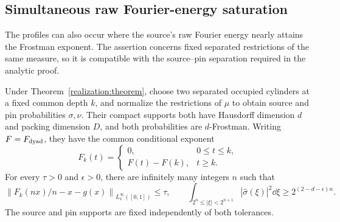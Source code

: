 \subsection{Simultaneous raw Fourier-energy saturation}
\label{realization:fourier-section}

The profiles can also occur where the source's raw Fourier energy nearly
attains the Frostman exponent. The assertion concerns fixed separated
restrictions of the same measure, so it is compatible with the source--pin
separation required in the analytic proof.

\begin{proposition}
\label{realization:fourier}
Under Theorem~\ref{realization:theorem}, choose two separated occupied
cylinders at a fixed common depth \(k\), and normalize the restrictions
of \(\mu\) to obtain source and pin probabilities \(\sigma,\nu\).
Their compact supports both have Hausdorff dimension \(d\) and packing
dimension \(D\), and both probabilities are \(d\)-Frostman.
Writing \(F=F_{\rm dyad}\), they have the common conditional exponent
\[
 F_k(t)=\begin{cases}0,&0\le t\le k,\\
 F(t)-F(k),&t\ge k.
 \end{cases}
\]
For every \(\tau>0\) and \(\epsilon>0\), there are infinitely many
integers \(n\) such that
\begin{equation}\label{realization:fourier-conclusion}
 \left\|F_k(nx)/n-x-g(x)\right\|_{L^\infty_x([0,1])}\le\tau,
 \qquad
 \int_{2^n\le|\xi|<2^{n+1}}|\widehat\sigma(\xi)|^2\dd\xi
 \ge2^{(2-d-\epsilon)n}.
\end{equation}
The source and pin supports are fixed independently of both tolerances.
\end{proposition}

